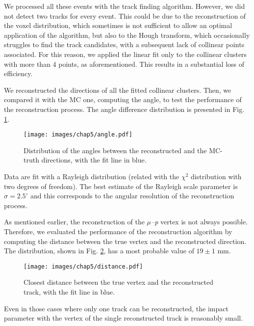We processed all these events with the track finding algorithm. However, we did not detect two tracks for every event. This could be due to the reconstruction of the voxel distribution, which sometimes is not sufficient to allow an optimal application of the \lpc algorithm, but also to the Hough transform, which occasionally struggles to find the track candidates, with a subsequent lack of collinear points associated.
For this reason, we applied the linear fit only to the collinear clusters with more than 4 \lpc points, as aforementioned. This results in a substantial loss of efficiency.

We reconstructed the directions of all the fitted collinear clusters. Then, we compared it with the MC one, computing the angle, to test the performance of the reconstruction process. The angle difference distribution is presented in Fig. \ref{fig:angle_reco-MC}. 

\begin{figure}[h!]
    \centering
    \texttt{[image: images/chap5/angle.pdf]}
    \caption{Distribution of the angles between the reconstructed and the MC-truth directions, with the fit line in blue.}
    \label{fig:angle_reco-MC}
\end{figure}

Data are fit with a Rayleigh distribution (related with the $\chi^2$ distribution with two degrees of freedom). 
The best estimate of the Rayleigh scale parameter is  $\sigma = 2.5 ^\circ$ and this corresponds to the angular resolution of the reconstruction process. 

As mentioned earlier, the reconstruction of the \textit{$\mu$--p} vertex is not always possible. Therefore, we evaluated the performance of the reconstruction algorithm by computing the distance between the true vertex and the reconstructed direction. The distribution, shown in Fig. \ref{fig:closest-dist-to-track}, has a most probable value of $19 \pm 1$ mm.

\begin{figure}[h!]
    \centering
    \texttt{[image: images/chap5/distance.pdf]}
    \caption{Closest distance between the true vertex and the reconstructed track, with the fit line in blue.}
    \label{fig:closest-dist-to-track}
\end{figure}

Even in those cases where only one track can be reconstructed, the impact parameter with the vertex of the single reconstructed track is reasonably small.

